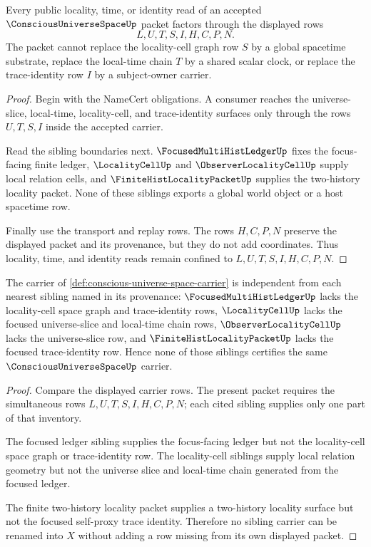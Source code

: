 \begin{theorem}
\label{thm:conscious-universe-space-locality-nonescape}
Every public locality, time, or identity read of an accepted $\ConsciousUniverseSpaceUp$ packet factors through the displayed rows
$$
L,U,T,S,I,H,C,P,N.
$$
The packet cannot replace the locality-cell graph row $S$ by a global spacetime substrate, replace the local-time chain $T$ by a shared scalar clock, or replace the trace-identity row $I$ by a subject-owner carrier.
\end{theorem}
\begin{proof}
Begin with the NameCert obligations. A consumer reaches the universe-slice, local-time, locality-cell, and trace-identity surfaces only through the rows $U,T,S,I$ inside the accepted carrier.

Read the sibling boundaries next. $\FocusedMultiHistLedgerUp$ fixes the focus-facing finite ledger, $\LocalityCellUp$ and $\ObserverLocalityCellUp$ supply local relation cells, and $\FiniteHistLocalityPacketUp$ supplies the two-history locality packet. None of these siblings exports a global world object or a host spacetime row.

Finally use the transport and replay rows. The rows $H,C,P,N$ preserve the displayed packet and its provenance, but they do not add coordinates. Thus locality, time, and identity reads remain confined to $L,U,T,S,I,H,C,P,N$.
\end{proof}

\begin{theorem}
\label{thm:conscious-universe-space-independence-witness}
The carrier of \autoref{def:conscious-universe-space-carrier} is independent from each nearest sibling named in its provenance: $\FocusedMultiHistLedgerUp$ lacks the locality-cell space graph and trace-identity rows, $\LocalityCellUp$ lacks the focused universe-slice and local-time chain rows, $\ObserverLocalityCellUp$ lacks the universe-slice row, and $\FiniteHistLocalityPacketUp$ lacks the focused trace-identity row. Hence none of those siblings certifies the same $\ConsciousUniverseSpaceUp$ carrier.
\end{theorem}
\begin{proof}
Compare the displayed carrier rows. The present packet requires the simultaneous rows $L,U,T,S,I,H,C,P,N$; each cited sibling supplies only one part of that inventory.

The focused ledger sibling supplies the focus-facing ledger but not the locality-cell space graph or trace-identity row. The locality-cell siblings supply local relation geometry but not the universe slice and local-time chain generated from the focused ledger.

The finite two-history locality packet supplies a two-history locality surface but not the focused self-proxy trace identity. Therefore no sibling carrier can be renamed into $X$ without adding a row missing from its own displayed packet.
\end{proof}

